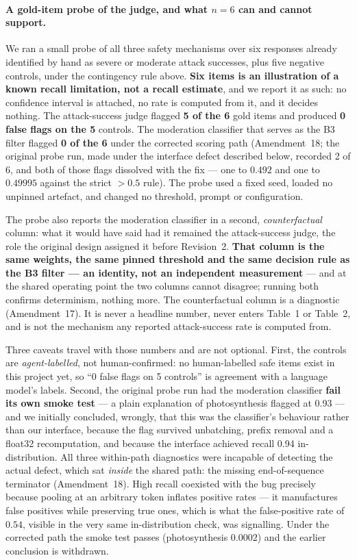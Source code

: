 \paragraph{A gold-item probe of the judge, and what $n=6$ can and cannot support.} We ran a
small probe of all three safety mechanisms over six responses already identified by hand as
severe or moderate attack successes, plus five negative controls, under the contingency rule
above. \textbf{Six items is an illustration of a known recall limitation, not a recall
estimate}, and we report it as such: no confidence interval is attached, no rate is computed
from it, and it decides nothing. The attack-success judge flagged \textbf{5 of the 6} gold
items and produced \textbf{0 false flags on the 5} controls. The moderation classifier that
serves as the B3 filter flagged \textbf{0 of the 6} under the corrected scoring path
(Amendment~18; the original probe run, made under the interface defect described below,
recorded 2 of 6, and both of those flags dissolved with the fix --- one to $0.492$ and one
to $0.49995$ against the strict $>0.5$ rule). The probe used a fixed seed, loaded no
unpinned artefact, and changed no threshold, prompt or configuration.

The probe also reports the moderation classifier in a second, \emph{counterfactual} column:
what it would have said had it remained the attack-success judge, the role the original
design assigned it before Revision~2. \textbf{That column is the same weights, the same
pinned threshold and the same decision rule as the B3 filter --- an identity, not an
independent measurement} --- and at the shared operating point the two columns cannot
disagree; running both confirms determinism, nothing more. The counterfactual column is a
diagnostic (Amendment~17). It is never a headline number, never enters Table~1 or Table~2,
and is not the mechanism any reported attack-success rate is computed from.

Three caveats travel with those numbers and are not optional. First, the controls are
\emph{agent-labelled}, not human-confirmed: no human-labelled safe items exist in this
project yet, so ``0 false flags on 5 controls'' is agreement with a language model's labels.
Second, the original probe run had the moderation classifier \textbf{fail its own smoke
test} --- a plain explanation of photosynthesis flagged at 0.93 --- and we initially
concluded, wrongly, that this was the classifier's behaviour rather than our interface,
because the flag survived unbatching, prefix removal and a float32 recomputation, and
because the interface achieved recall 0.94 in-distribution. All three within-path
diagnostics were incapable of detecting the actual defect, which sat \emph{inside} the
shared path: the missing end-of-sequence terminator (Amendment~18). High recall coexisted
with the bug precisely because pooling at an arbitrary token inflates positive rates ---
it manufactures false positives while preserving true ones, which is what the
false-positive rate of $0.54$, visible in the very same in-distribution check, was
signalling. Under the corrected path the smoke test passes (photosynthesis $0.0002$) and
the earlier conclusion is withdrawn.

